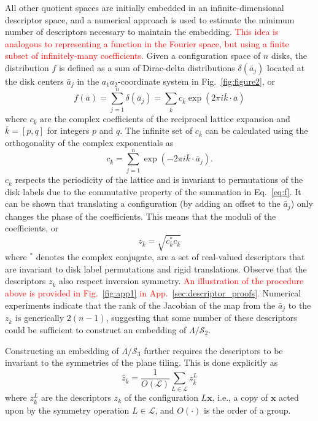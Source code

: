 \documentclass[default,iicol]{sn-jnl}%
\theoremstyle{thmstyleone}%
\theoremstyle{thmstyletwo}%
\theoremstyle{thmstylethree}%
\renewcommand{\vec}[1]{\bar{#1}}
\providecommand{\config}[1]{\mathbf{#1}}
\providecommand{\rmi}{i}
\providecommand{\red}[1]{\textcolor{red}{#1}}
\begin{document}
All other quotient spaces are initially embedded in an infinite-dimensional descriptor space, and a numerical approach is used to estimate the minimum number of descriptors necessary to maintain the embedding. \red{This idea is analogous to representing a function in the Fourier space, but using a finite subset of infinitely-many coefficients.} Given a configuration space of $n$ disks, the distribution $f$ is defined as a sum of Dirac-delta distributions $\delta(\vec{a}_j)$ located at the disk centers $\vec{a}_j$ in the $a_1a_2$-coordinate system in Fig.\ \ref{fig:figure2}, or
\begin{equation}
	f(\vec{a}) 	= \sum_{j = 1}^{n} \delta(\vec{a}_j) = \sum_{\vec{k}} {c_{\vec{k}} \exp{(2\pi \rmi \vec{k} \cdot \vec{a})}}
	\label{eq:f}
\end{equation}
where $c_{\vec{k}}$ are the complex coefficients of the reciprocal lattice expansion and $\vec{k} = [p, q]$ for integers $p$ and $q$. The infinite set of $c_{\vec{k}}$ can be calculated using the orthogonality of the complex exponentials as
\begin{equation}
c_{\vec{k}} = \sum_{j=1}^{n} \exp{(-2\pi \rmi \vec{k} \cdot \vec{a}_j)} .
\label{eq:c_k}
\end{equation}
$c_{\vec{k}}$ respects the periodicity of the lattice and is invariant to permutations of the disk labels due to the commutative property of the summation in Eq.\ \ref{eq:f}. It can be shown that translating a configuration (by adding an offset to the $\vec{a}_j$) only changes the phase of the coefficients. This means that the moduli of the coefficients, or
\begin{equation}
z_{\vec{k}} = \sqrt{c^\ast_{\vec{k}} c_{\vec{k}}}
\label{eq:z_k}
\end{equation}
where $^\ast$ denotes the complex conjugate, are a set of real-valued descriptors that are invariant to disk label permutations and rigid translations. Observe that the descriptors $z_{\vec{k}}$ also respect inversion symmetry. \red{An illustration of the procedure above is provided in Fig.\ \ref{fig:app1} in App.\ \ref{sec:descriptor_proofs}. } Numerical experiments indicate that the rank of the Jacobian of the map from the $\vec{a}_j$ to the $z_{\vec{k}}$ is generically $2(n - 1)$, suggesting that some number of these descriptors could be sufficient to construct an embedding of $\Lambda / \mathcal{S}_2$.

Constructing an embedding of $\Lambda / \mathcal{S}_3$ further requires the descriptors to be invariant to the symmetries of the plane tiling. This is done explicitly as
\begin{equation}
\hat{z}_{\vec{k}} = \frac{1}{O(\mathcal{L})}\sum_{L \in \mathcal{L}} z_{\vec{k}}^{L}
\label{eq:z_hat_k}
\end{equation}
where $z_{\vec{k}}^{L}$ are the descriptors $z_{\vec{k}}$ of the configuration $L \config{x}$, i.e., a copy of $\config{x}$ acted upon by the symmetry operation $L \in \mathcal{L}$, and $O(\cdot)$ is the order of a group.
\end{document}
